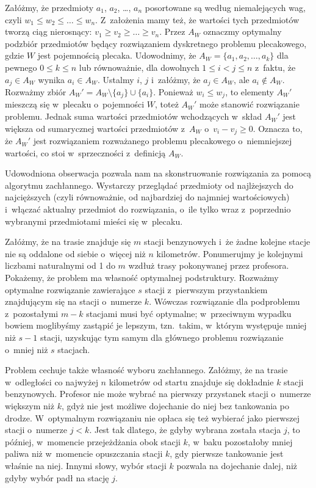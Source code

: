 \exercise %
Załóżmy, że przedmioty $a_1$, $a_2$, \dots, $a_n$ posortowane są według niemalejących wag, czyli $w_1\le w_2\le\dots\le w_n$.
Z~założenia mamy też, że wartości tych przedmiotów tworzą ciąg nierosnący: $v_1\ge v_2\ge\dots\ge v_n$.
Przez $A_W$ oznaczmy optymalny podzbiór przedmiotów będący rozwiązaniem dyskretnego problemu plecakowego, gdzie $W$ jest pojemnością plecaka.
Udowodnimy, że $A_W=\{a_1,a_2,\dots,a_k\}$ dla pewnego $0\le k\le n$ lub równoważnie, dla dowolnych $1\le i<j\le n$ z~faktu, że $a_j\in A_W$ wynika $a_i\in A_W$.
Ustalmy $i$, $j$ i~załóżmy, że $a_j\in A_W$, ale $a_i\not\in A_W$.
Rozważmy zbiór $A_W'=A_W\setminus\{a_j\}\cup\{a_i\}$.
Ponieważ $w_i\le w_j$, to elementy $A_W'$ mieszczą się w~plecaku o~pojemności $W$, toteż $A_W'$ może stanowić rozwiązanie problemu.
Jednak suma wartości przedmiotów wchodzących w~skład $A_W'$ jest większa od sumarycznej wartości przedmiotów z~$A_W$ o~$v_i-v_j\ge0$.
Oznacza to, że $A_W'$ jest rozwiązaniem rozważanego problemu plecakowego o~niemniejszej wartości, co stoi w~sprzeczności z~definicją $A_W$.

Udowodniona obserwacja pozwala nam na skonstruowanie rozwiązania za pomocą algorytmu zachłannego.
Wystarczy przeglądać przedmioty od najlżejszych do najcięższych (czyli równoważnie, od najbardziej do najmniej wartościowych) i~włączać aktualny przedmiot do rozwiązania, o~ile tylko wraz z~poprzednio wybranymi przedmiotami mieści się w~plecaku.

\exercise %
Załóżmy, że na trasie znajduje się $m$ stacji benzynowych i~że żadne kolejne stacje nie są oddalone od siebie o~więcej niż $n$ kilometrów.
Ponumerujmy je kolejnymi liczbami naturalnymi od 1 do $m$ wzdłuż trasy pokonywanej przez profesora.
Pokażemy, że problem ma własność optymalnej podstruktury.
Rozważmy optymalne rozwiązanie zawierające $s$ stacji z~pierwszym przystankiem znajdującym się na stacji o~numerze $k$.
Wówczas rozwiązanie dla podproblemu z~pozostałymi $m-k$ stacjami musi być optymalne; w~przeciwnym wypadku bowiem moglibyśmy zastąpić je lepszym, tzn.\ takim, w~którym występuje mniej niż $s-1$ stacji, uzyskując tym samym dla głównego problemu rozwiązanie o~mniej niż $s$ stacjach.

Problem cechuje także własność wyboru zachłannego.
Załóżmy, że na trasie w~odległości co najwyżej $n$ kilometrów od startu znajduje się dokładnie $k$ stacji benzynowych.
Profesor nie może wybrać na pierwszy przystanek stacji o~numerze większym niż $k$, gdyż nie jest możliwe dojechanie do niej bez tankowania po drodze.
W~optymalnym rozwiązaniu nie opłaca się też wybierać jako pierwszej stacji o~numerze $j<k$.
Jest tak dlatego, że gdyby wybrana została stacja $j$, to później, w~momencie przejeżdżania obok stacji $k$, w~baku pozostałoby mniej paliwa niż w~momencie opuszczania stacji $k$, gdy pierwsze tankowanie jest właśnie na niej.
Innymi słowy, wybór stacji $k$ pozwala na dojechanie dalej, niż gdyby wybór padł na stację $j$.

